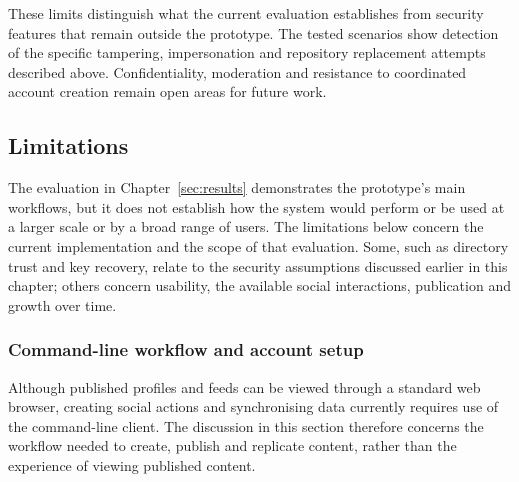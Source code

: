 These limits distinguish what the current evaluation establishes from
security features that remain outside the prototype. The tested scenarios
show detection of the specific tampering, impersonation and repository
replacement attempts described above. Confidentiality, moderation and
resistance to coordinated account creation remain open areas for future
work.

\subsection{Limitations}

The evaluation in Chapter~\ref{sec:results} demonstrates the prototype's
main workflows, but it does not establish how the system would perform or be
used at a larger scale or by a broad range of users. The limitations below
concern the current implementation and the scope of that evaluation. Some,
such as directory trust and key recovery, relate to the security assumptions
discussed earlier in this chapter; others concern usability, the available
social interactions, publication and growth over time.

\subsubsection{Command-line workflow and account setup}\label{sec:limitation-command-line}
Although published profiles and feeds can be viewed through a standard web browser, 
creating social actions and synchronising data currently requires use of the command-line client. 
The discussion in this section therefore concerns the workflow needed to create, publish and replicate 
content, rather than the experience of viewing published content.

